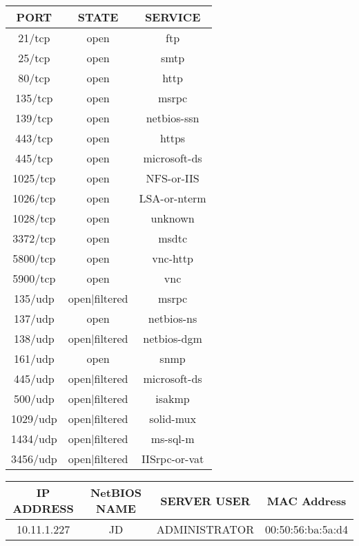 \documentclass[11pt, a4paper]{article}
\begin{document}
\begin{center}
    \begin{tabular}{||c c c||} 
     \hline
     PORT & STATE & SERVICE\\ [0.5ex] 
     \hline\hline
     21/tcp & open & ftp\\ 
     25/tcp & open & smtp\\
     80/tcp  & open & http\\
     135/tcp & open & msrpc\\
     139/tcp & open & netbios-ssn\\
     443/tcp & open & https\\
     445/tcp & open & microsoft-ds\\
     1025/tcp & open & NFS-or-IIS\\
     1026/tcp & open & LSA-or-nterm\\
     1028/tcp & open & unknown\\
     3372/tcp & open & msdtc\\
     5800/tcp & open & vnc-http\\
     5900/tcp & open & vnc\\
     135/udp & open|filtered & msrpc\\
     137/udp & open & netbios-ns\\
     138/udp & open|filtered & netbios-dgm\\
     161/udp & open & snmp\\
     445/udp & open|filtered & microsoft-ds\\
     500/udp & open|filtered & isakmp\\
     1029/udp & open|filtered & solid-mux\\
     1434/udp & open|filtered & ms-sql-m\\
     3456/udp & open|filtered & IISrpc-or-vat\\ [1ex]
     \hline
    \end{tabular}
\end{center}

\begin{center}
    \begin{tabular}{||c c c c||} 
     \hline
     IP ADDRESS & NetBIOS NAME & SERVER USER & MAC Address\\ [0.5ex] 
     \hline\hline
    10.11.1.227 & JD & ADMINISTRATOR & 00:50:56:ba:5a:d4\\ [1ex]
     \hline
    \end{tabular}
\end{center}
\end{document}
